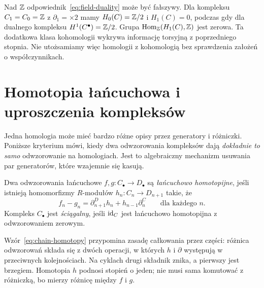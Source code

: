 \begin{uwaga}
Nad $\mathbb{Z}$ odpowiednik~\eqref{eq:field-duality}
może być fałszywy. Dla kompleksu
$C_1=C_0=\mathbb{Z}$ z $\partial_1=\times2$ mamy
$H_0(C)=\mathbb{Z}/2$ i $H_1(C)=0$,
podczas gdy dla dualnego kompleksu
$H^1(C^\bullet)=\mathbb{Z}/2$.
Grupa $\operatorname{Hom}_{\mathbb{Z}}
(H_1(C),\mathbb{Z})$ jest zerowa.
Ta dodatkowa klasa kohomologii
wykrywa informację torsyjną z
poprzedniego stopnia. Nie utożsamiamy
więc homologii z kohomologią bez
sprawdzenia założeń o współczynnikach.
\end{uwaga}
\section{Homotopia łańcuchowa i uproszczenia kompleksów}
\label{sec:homotopia-lancuchowa}

Jedna homologia może mieć bardzo różne opisy
przez generatory i różniczki. Poniższe kryterium
mówi, kiedy dwa odwzorowania kompleksów dają
\emph{dokładnie to samo} odwzorowanie na
homologiach. Jest to algebraiczny mechanizm
usuwania par generatorów, które wzajemnie
się kasują.

\begin{definicja}
\label{def:homotopia-lancuchowa}
Dwa odwzorowania łańcuchowe $f,g:C_\bullet\to D_\bullet$
są \emph{łańcuchowo homotopijne}, jeśli istnieją
homomorfizmy $R$-modułów $h_n:C_n\to D_{n+1}$ takie, że
\begin{equation}\label{eq:chain-homotopy}
 f_n-g_n=\partial^D_{n+1}h_n+h_{n-1}\partial^C_n
 \qquad\text{dla każdego }n.
\end{equation}
Kompleks $C_\bullet$ jest \emph{ściągalny},
jeśli $\mathrm{id}_C$ jest łańcuchowo homotopijna
z odwzorowaniem zerowym.
\end{definicja}

Wzór~\eqref{eq:chain-homotopy} przypomina
zasadę całkowania przez części: różnica
odwzorowań składa się z dwóch operacji, w których
$h$ i $\partial$ występują w przeciwnych
kolejnościach. Na cyklach drugi składnik
znika, a pierwszy jest brzegiem. Homotopia $h$
podnosi stopień o jeden; nie musi sama komutować
z różniczką, bo mierzy różnicę między $f$ i $g$.

